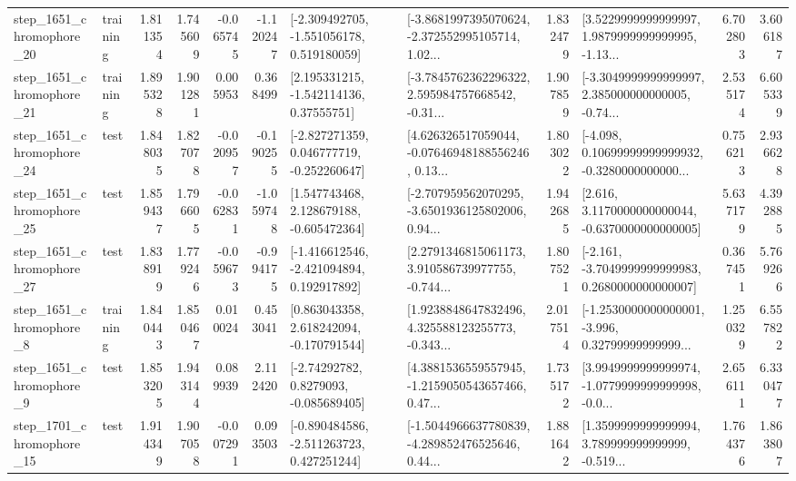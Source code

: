 \begin{tabular}{llrrrrllrlrr}
 step\_1651\_chromophore\_20 &  training &      1.811354 &    1.745609 &     -0.065745 & -1.120247 &   [-2.309492705, -1.551056178, 0.519180059] &  [-3.8681997395070624, -2.372552995105714, 1.02... &       1.832479 &  [3.5229999999999997, 1.9879999999999995, -1.13... &            6.702803 &          3.606187 \\
 step\_1651\_chromophore\_21 &  training &      1.895328 &    1.901281 &      0.005953 &  0.368499 &     [2.195331215, -1.542114136, 0.37555751] &  [-3.7845762362296322, 2.595984757668542, -0.31... &       1.907859 &  [-3.3049999999999997, 2.385000000000005, -0.74... &            2.535174 &          6.605339 \\
 step\_1651\_chromophore\_24 &      test &      1.848035 &    1.827078 &     -0.020957 & -0.190255 &   [-2.827271359, 0.046777719, -0.252260647] &  [4.626326517059044, -0.07646948188556246, 0.13... &       1.803022 &  [-4.098, 0.10699999999999932, -0.3280000000000... &            0.756213 &          2.936628 \\
 step\_1651\_chromophore\_25 &      test &      1.859437 &    1.796605 &     -0.062831 & -1.059748 &    [1.547743468, 2.128679188, -0.605472364] &  [-2.707959562070295, -3.6501936125802006, 0.94... &       1.942685 &   [2.616, 3.1170000000000044, -0.6370000000000005] &            5.637179 &          4.392885 \\
 step\_1651\_chromophore\_27 &      test &      1.838919 &    1.779246 &     -0.059673 & -0.994175 &   [-1.416612546, -2.421094894, 0.192917892] &  [2.2791346815061173, 3.910586739977755, -0.744... &       1.807521 &  [-2.161, -3.7049999999999983, 0.2680000000000007] &            0.367451 &          5.769266 \\
  step\_1651\_chromophore\_8 &  training &      1.840443 &    1.850467 &      0.010024 &  0.453041 &    [0.863043358, 2.618242094, -0.170791544] &  [1.9238848647832496, 4.325588123255773, -0.343... &       2.017514 &  [-1.2530000000000001, -3.996, 0.32799999999999... &            1.250329 &          6.557822 \\
  step\_1651\_chromophore\_9 &      test &      1.853205 &    1.943144 &      0.089939 &  2.112420 &      [-2.74292782, 0.8279093, -0.085689405] &  [4.3881536559557945, -1.2159050543657466, 0.47... &       1.735172 &  [3.9949999999999974, -1.0779999999999998, -0.0... &            2.656111 &          6.330477 \\
 step\_1701\_chromophore\_15 &      test &      1.914349 &    1.907058 &     -0.007291 &  0.093503 &   [-0.890484586, -2.511263723, 0.427251244] &  [-1.5044966637780839, -4.289852476525646, 0.44... &       1.881642 &  [1.3599999999999994, 3.789999999999999, -0.519... &            1.764376 &          1.863807 \\

\end{tabular}
